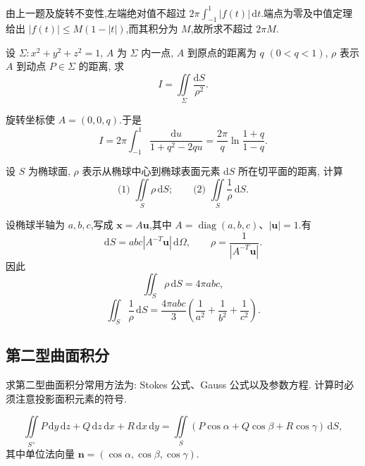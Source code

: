\begin{solution}
    由上一题及旋转不变性,左端绝对值不超过 $2\pi\int_{-1}^1|f(t)|\,\mathrm{d}t$.端点为零及中值定理给出 $|f(t)|\leq M(1-|t|)$,而其积分为 $M$,故所求不超过 $2\pi M$.
\end{solution}

\begin{example}
    设 $\Sigma:x^2+y^2+z^2=1$, $A$ 为 $\Sigma$ 内一点, $A$ 到原点的距离为 $q$ $(0<q<1)$, $\rho$ 表示 $A$ 到动点 $P\in\Sigma$ 的距离, 求
    \[
        I=\iint\limits_\Sigma\dfrac{\mathrm{d}S}{\rho^2}.
    \]
\end{example}
\exampleblank

\begin{solution}
    旋转坐标使 $A=(0,0,q)$.于是
    \[
        I=2\pi\int_{-1}^1\dfrac{\mathrm{d}u}{1+q^2-2qu}
        =\dfrac{2\pi}{q}\ln\dfrac{1+q}{1-q}.
    \]
\end{solution}

\begin{example}
    设 $S$ 为椭球面, $\rho$ 表示从椭球中心到椭球表面元素 $\mathrm{d}S$ 所在切平面的距离, 计算
    \[
        \text{(1) }\iint\limits_S\rho\,\mathrm{d}S;
        \qquad
        \text{(2) }\iint\limits_S\dfrac{1}{\rho}\,\mathrm{d}S.
    \]
\end{example}
\exampleblank

\begin{solution}
    设椭球半轴为 $a,b,c$,写成 $\bm x=A\bm u$,其中 $A=\operatorname{diag}(a,b,c)$、$|\bm u|=1$.有
    \[
        \mathrm{d}S=abc|A^{-T}\bm u|\,\mathrm{d}\Omega,\qquad
        \rho=\dfrac{1}{|A^{-T}\bm u|}.
    \]
    因此
    \[
        \iint_S\rho\,\mathrm{d}S=4\pi abc,
    \]
    \[
        \iint_S\dfrac{1}{\rho}\,\mathrm{d}S
        =\dfrac{4\pi abc}{3}\left(\dfrac{1}{a^2}+\dfrac{1}{b^2}+\dfrac{1}{c^2}\right).
    \]
\end{solution}



\subsection{第二型曲面积分}

求第二型曲面积分常用方法为: Stokes 公式、Gauss 公式以及参数方程. 计算时必须注意投影面积元素的符号.

\begin{theorem}[\markstar]
    \[
        \iint\limits_{S^+}P\,\mathrm{d}y\,\mathrm{d}z+Q\,\mathrm{d}z\,\mathrm{d}x+R\,\mathrm{d}x\,\mathrm{d}y
        =\iint\limits_S(P\cos\alpha+Q\cos\beta+R\cos\gamma)\,\mathrm{d}S,
    \]
    其中单位法向量 $\bm n=(\cos\alpha,\cos\beta,\cos\gamma)$.
\end{theorem}

